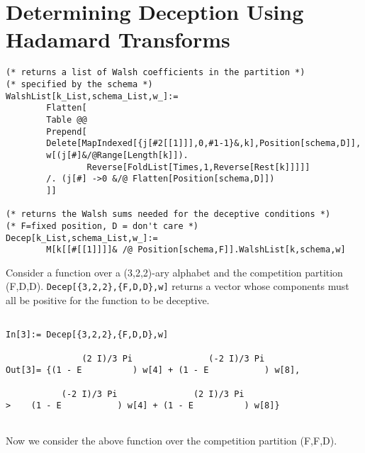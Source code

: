 \section{Determining Deception Using Hadamard Transforms}
\begin{verbatim}
(* returns a list of Walsh coefficients in the partition *)
(* specified by the schema *)
WalshList[k_List,schema_List,w_]:=
        Flatten[
        Table @@
        Prepend[
        Delete[MapIndexed[{j[#2[[1]]],0,#1-1}&,k],Position[schema,D]],
        w[(j[#]&/@Range[Length[k]]).
                Reverse[FoldList[Times,1,Reverse[Rest[k]]]]]
        /. (j[#] ->0 &/@ Flatten[Position[schema,D]])
        ]]

(* returns the Walsh sums needed for the deceptive conditions *)
(* F=fixed position, D = don't care *)
Decep[k_List,schema_List,w_]:=
        M[k[[#[[1]]]]& /@ Position[schema,F]].WalshList[k,schema,w]

\end{verbatim}
\begin{example}
Consider a function over a (3,2,2)-ary alphabet and the competition
partition (F,D,D).  {\tt Decep[\{3,2,2\},\{F,D,D\},w]} returns a vector whose components
must all be positive for the function to be deceptive.
\end{example}
\begin{verbatim}

In[3]:= Decep[{3,2,2},{F,D,D},w]

               (2 I)/3 Pi               (-2 I)/3 Pi
Out[3]= {(1 - E          ) w[4] + (1 - E           ) w[8], 
 
           (-2 I)/3 Pi               (2 I)/3 Pi
>    (1 - E           ) w[4] + (1 - E          ) w[8]}


\end{verbatim}
\begin{example}
Now we consider the above function over the competition partition (F,F,D).
\end{example}
